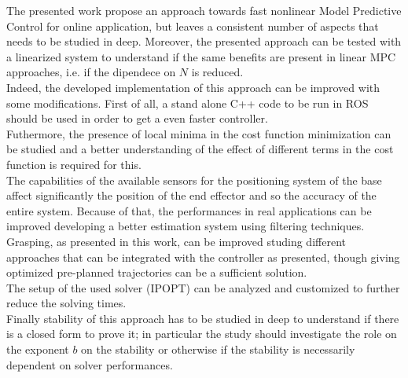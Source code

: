 The presented work propose an approach towards fast nonlinear Model Predictive Control for online application, but leaves a consistent number of aspects that needs to be studied in deep. Moreover, the presented approach can be tested with a linearized system to understand if the same benefits are present in linear MPC approaches, i.e. if the dipendece on $N$ is reduced.\\
Indeed, the developed implementation of this approach can be improved with some modifications. First of all, a stand alone C++ code to be run in ROS should be used in order to get a even faster controller.\\
Futhermore, the presence of local minima in the cost function minimization can be studied and a better understanding of the effect of different terms in the cost function is required for this. \\
The capabilities of the available sensors for the positioning system of the base affect significantly the position of the end effector and so the accuracy of the entire system. Because of that, the performances in real applications can be improved developing a better estimation system using filtering techniques. \\
Grasping, as presented in this work, can be improved studing different approaches that can be integrated with the controller as presented, though giving optimized pre-planned trajectories can be a sufficient solution. \\
The setup of the used solver (IPOPT) can be analyzed and customized to further reduce the solving times. \\
Finally stability of this approach has to be studied in deep to understand if there is a closed form to prove it; in particular the study should investigate the role on the exponent $b$ on the stability or otherwise if the stability is necessarily dependent on solver performances.


